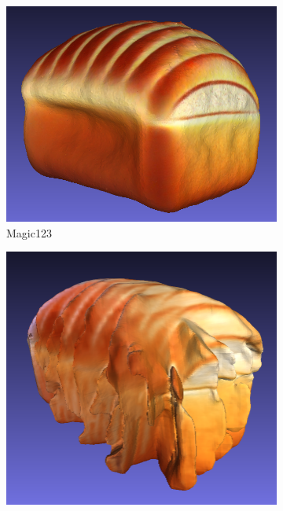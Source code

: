 \begin{figure}[ht]
    \begin{subfigure}[b]{0.269\textwidth}
        \centering
        \includegraphics[width=\textwidth]{etc/a rendering of a highly symmetrical loaf of bread/magic123/magic123_bread_result.png}
        \caption{Magic123}
        \vspace{0.1cm}
    \end{subfigure}
    \begin{subfigure}[b]{0.23\textwidth}
        \centering
        \includegraphics[width=\textwidth]{etc/a rendering of a highly symmetrical loaf of bread/wonder3D/wonder3d_bread_result.png}

\end{subfigure}
\end{figure}
